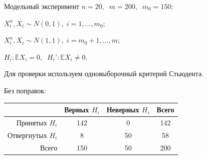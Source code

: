 \documentclass[9pt,pdf,utf8,hyperref={unicode},aspectratio=169]{beamer}
\begin{document}
\begin{frame}{Модельный эксперимент}
    $n = 20, \;\; m=200, \;\; m_0 = 150;$

    $X_i^n, X_{i} \sim N\left(0,1\right), \;i=1,\ldots,m_0;$

    $X_i^n, X_{i} \sim N\left(1,1\right), \;i=m_0+1,\ldots,m;$

    $H_i\colon \mathbb{E}X_{i} = 0, \;\; H_i'\colon \mathbb{E}X_{i} \neq 0.$

    Для проверки используем одновыборочный критерий Стьюдента.

    \bigskip

    Без поправок:
    \begin{center}
        \begin{tabular}{ |r | c | c | c |}
        \hline
                          & Верных $H_i$ & Неверных $H_i$ & Всего \\ \hline
        Принятых $H_i$    & 142          & 0              & 142   \\ \hline
        Отвергнутых $H_i$ & 8            & 50             & 58    \\ \hline
        Всего             & 150          & 50             & 200   \\ \hline
        \end{tabular}
    \end{center}


\end{frame}
\end{document}
